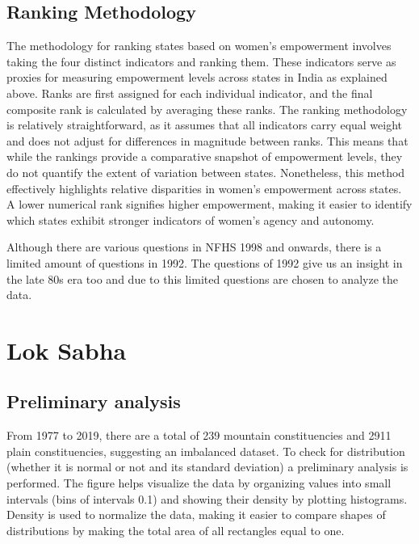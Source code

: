 \subsection{Ranking Methodology}
\label{ranking_methodology}
\begin{sloppypar}
 The methodology for ranking states based on women's empowerment involves taking the four distinct indicators and ranking them. These indicators serve as proxies for measuring empowerment levels across states in India as explained above. Ranks are first assigned for each individual indicator, and the final composite rank is calculated by averaging these ranks. The ranking methodology is relatively straightforward, as it assumes that all indicators carry equal weight and does not adjust for differences in magnitude between ranks. This means that while the rankings provide a comparative snapshot of empowerment levels, they do not quantify the extent of variation between states. Nonetheless, this method effectively highlights relative disparities in women's empowerment across states. A lower numerical rank signifies higher empowerment, making it easier to identify which states exhibit stronger indicators of women's agency and autonomy.
\end{sloppypar}
\vspace{0.3cm}

Although there are various questions in NFHS 1998 and onwards, there is a limited amount of questions in 1992. The questions of 1992 give us an insight in the late 80s era too and due to this limited questions are chosen to analyze the data.


\section{Lok Sabha}
\subsection{Preliminary analysis}

From 1977 to 2019, there are a total of 239 mountain constituencies and 2911 plain constituencies, suggesting an imbalanced dataset. To check for distribution (whether it is normal or not and its standard deviation) a preliminary analysis is performed. The figure helps visualize the data by organizing values into small intervals (bins of intervals 0.1) and showing their density by plotting histograms. Density is used to normalize the data, making it easier to compare shapes of distributions by making the total area of all rectangles equal to one.


